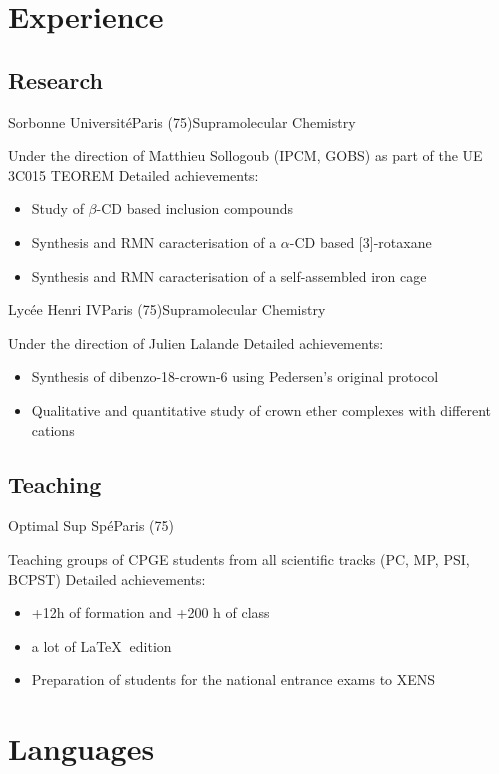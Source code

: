 \documentclass[11pt,a4paper,sans]{moderncv}
\begin{document}
\section{Experience}
%
%
\subsection{Research}
%
%
%
{Sorbonne Université}{Paris (75)}{Supramolecular Chemistry}%
{Under the direction of Matthieu Sollogoub (IPCM, GOBS) as part of the UE 3C015 TEOREM\newline{}%
Detailed achievements:%
\begin{itemize}%
\item Study of $\beta$-CD based inclusion compounds
\item Synthesis and RMN caracterisation of a $\alpha$-CD based [3]-rotaxane
\item Synthesis and RMN caracterisation of a self-assembled iron cage
\end{itemize}
}
%
%
%
{Lycée Henri IV}{Paris (75)}{Supramolecular Chemistry}%
{Under the direction of Julien Lalande \newline{}%
Detailed achievements:%
\begin{itemize}%
\item Synthesis of dibenzo-18-crown-6 using Pedersen's original protocol
\item Qualitative and quantitative study of crown ether complexes with different cations
\end{itemize}
}
%
%
%
\subsection{Teaching}
%
{Optimal Sup Spé}{Paris (75)}{}%
{Teaching groups of CPGE students from all scientific tracks (PC, MP, PSI, BCPST)\newline{}%
Detailed achievements:%
\begin{itemize}%
\item +12h of formation and +200 h of class
\item a lot of {\LaTeX} $~$edition
\item Preparation of students for the national entrance exams to XENS
\end{itemize}
}
%
%
%
\section{Languages}
%
%
%
\end{document}
